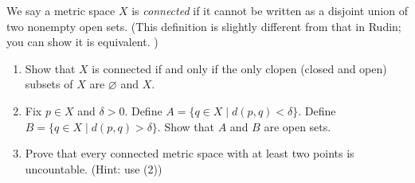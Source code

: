 \documentclass[12pt,letterpaper,reqno]{amsart}
\numberwithin{equation}{section}
\begin{document}
\begin{exercise}
We say a metric space $X$ is \textit{connected} if it cannot be written as a disjoint union of two nonempty open sets. (This definition is slightly different from that in Rudin; you can show it is equivalent. )

\begin{enumerate}
\item Show that $X$ is connected if and only if the only clopen (closed and open) subsets of $X$ are $\varnothing$ and $X$. 

\item Fix $p \in X$ and $\delta > 0$.  Define $A = \{q \in X \mid d(p,q) < \delta \}$.
Define $B = \{q \in X \mid d(p,q) > \delta \}$.  Show that $A$ and $B$ are open sets.

\item Prove that every connected metric space with at least two points is uncountable.  (Hint: use (2))


\end{enumerate}

\end{exercise}



\end{document}
